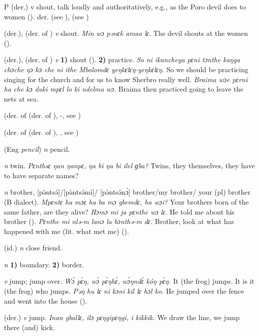 \begin{letter}{P}
 (der.) v shout, talk loudly and authoritatively, e.g., as the Poro devil does to women (\citealt{Pichl1967}). der.  (see ),  (see )

 (der.), (der. of ) \textit{v} shout. \textit{Min wɔ pənɛk amaa lɛ}. The devil shouts at the women (\citealt{Pichl1967}). 

 (der.), (der. of ) \textit{v} \textbf{1)} shout (\citealt{Pichl1967}). \textbf{2)} practice. \textit{So ni ikancheya pɛni tɔnthe kaŋga chɔche ŋɔ kɔ che ni ithe Mbolomdɛ yeŋkɛlɛŋ-yeŋkɛlɛŋ.} So we should be practicing singing for the church and for us to know Sherbro really well. \textit{Braima wɔe pɛrni ha che kɔ duki mpɛl lo ki ndelma wɔ.} Braima then practiced going to leave the nets at sea.

 (der. of  (der. of ), -, see )

 (der. of  (der. of ), , see ) 

 (Eng \textit{pencil}) \textit{n} pencil.

 \textit{n} twin. \textit{Pɛnthsɛ ŋan ŋanpɛ, ŋa bi ŋa bi ilel ɡba?} Twins, they themselves, they have to have separate names?

 \textit{n} brother, [pə̀ntsə́]/[pə̀ntsə́mì]/ [pə̀ntsə́nɔ̀] brother/my brother/ your (pl) brother (B dialect). \textit{Mpɛntɛ ha mɔɛ ha ba mɔ gbemdɛ, ha wɔi?} Your brothers born of the same father, are they alive? \textit{Hɔmɔ mi ja pɛnthe wɔ lɛ.} He told me about his brother (\citealt{Pichl1967}). \textit{Pɛnthe mi nlə-m lanɔ la bɔnthə-m dɛ.} Brother, look at what has happened with me (lit. what met me) (\citealt{Pichl1967}). 

 (id.) \textit{n} close friend.

 \textit{n} \textbf{1)} boundary. \textbf{2)} border.

 \textit{v} jump; jump over. \textit{Wɔ́ pɛ̀ŋ, wɔ̀ pɛ́ŋhɛ̀, wɔ̀ŋndɛ́ kóŋ pɛ̀ŋ.} It (the frog) jumps. It is it (the frog) who jumps. \textit{Pəŋ hu lɛ ni kɔni kil lɛ hɔl ko.} He jumped over the fence and went into the house (\citealt{Pichl1967}). 

 (der.) \textit{v} jump. \textit{Inan gballɛ, ilɔ pɛŋgipɛŋgi, i kikkik.} We draw the line, we jump there (and) kick.


\end{letter}

